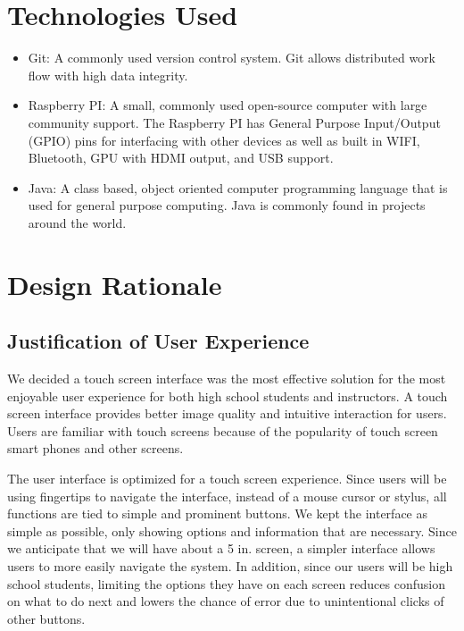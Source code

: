 \section{Technologies Used}
	\begin{itemize}
	\item Git: A commonly used version control system. Git allows distributed work flow with high data integrity.
	\item Raspberry PI: A small, commonly used open-source computer with large community support. The Raspberry PI has General Purpose Input/Output (GPIO) pins for interfacing with other devices as well as built in WIFI, Bluetooth, GPU with HDMI output, and USB support.
	\item Java: A class based, object oriented computer programming language that is used for general purpose computing. Java is commonly found in projects around the world.
	\end{itemize}


\section{Design Rationale}
\subsection{Justification of User Experience}

We decided a touch screen interface was the most effective solution for the most enjoyable user experience for both high school students and instructors. A touch screen interface provides better image quality and intuitive interaction for users. Users are familiar with touch screens because of the popularity of touch screen smart phones and other screens.

The user interface is optimized for a touch screen experience. Since users will be using fingertips to navigate the interface, instead of a mouse cursor or stylus, all functions are tied to simple and prominent buttons. We kept the interface as simple as possible, only showing options and information that are necessary. Since we anticipate that we will have about a 5 in. screen, a simpler interface allows users to more easily navigate the system. In addition, since our users will be high school students, limiting the options they have on each screen reduces confusion on what to do next and lowers the chance of error due to unintentional clicks of other buttons.

